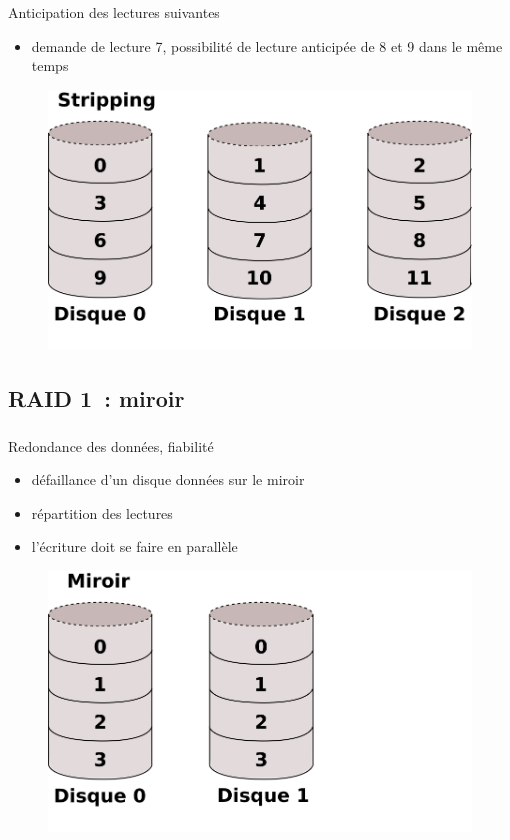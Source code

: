 \begin{frame}
  \frametitle{\insertsubsection}
  Anticipation des lectures suivantes
  \begin{itemize}
  \item demande de lecture 7, possibilité de \alert{lecture
    anticipée} de 8 et 9 dans le même temps
  \end{itemize}
  \begin{figure}
    \includegraphics[width=0.8\linewidth]{fig3/RAID0}
  \end{figure}
\end{frame}



\subsection{RAID 1~: miroir}
\begin{frame}
  \frametitle{\insertsubsection}
  \alert{Redondance} des données, fiabilité
  \small
  \begin{itemize}
  \item défaillance d'un disque  données sur le miroir
  \item \alert{répartition} des lectures
  \item \alert{l'écriture} doit se faire en parallèle
  \end{itemize}
  \normalsize
  \begin{figure}
    \includegraphics[width=0.75\linewidth]{fig3/RAID1}
  \end{figure}
\end{frame}


